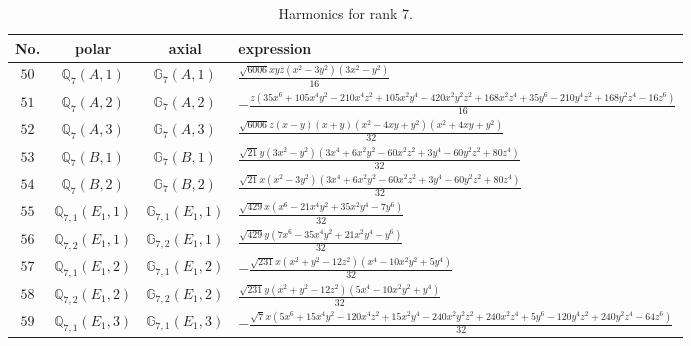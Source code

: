 \documentclass[fleqn,8pt,landscape]{jsarticle}
\begin{document}
\begin{table}[ht!]
\begin{center}
\caption{Harmonics for rank 7.}
\renewcommand{\arraystretch}{1.3}
\begin{tabular}{cccl} \hline \hline
No. & polar & axial & expression \\ \hline
$ 50 $ & $ \mathbb{Q}_{7}(A,1) $ & $ \mathbb{G}_{7}(A,1) $ & $ \frac{\sqrt{6006} x y z \left(x^{2} - 3 y^{2}\right) \left(3 x^{2} - y^{2}\right)}{16} $ \\
$ 51 $ & $ \mathbb{Q}_{7}(A,2) $ & $ \mathbb{G}_{7}(A,2) $ & $ - \frac{z \left(35 x^{6} + 105 x^{4} y^{2} - 210 x^{4} z^{2} + 105 x^{2} y^{4} - 420 x^{2} y^{2} z^{2} + 168 x^{2} z^{4} + 35 y^{6} - 210 y^{4} z^{2} + 168 y^{2} z^{4} - 16 z^{6}\right)}{16} $ \\
$ 52 $ & $ \mathbb{Q}_{7}(A,3) $ & $ \mathbb{G}_{7}(A,3) $ & $ \frac{\sqrt{6006} z \left(x - y\right) \left(x + y\right) \left(x^{2} - 4 x y + y^{2}\right) \left(x^{2} + 4 x y + y^{2}\right)}{32} $ \\
$ 53 $ & $ \mathbb{Q}_{7}(B,1) $ & $ \mathbb{G}_{7}(B,1) $ & $ \frac{\sqrt{21} y \left(3 x^{2} - y^{2}\right) \left(3 x^{4} + 6 x^{2} y^{2} - 60 x^{2} z^{2} + 3 y^{4} - 60 y^{2} z^{2} + 80 z^{4}\right)}{32} $ \\
$ 54 $ & $ \mathbb{Q}_{7}(B,2) $ & $ \mathbb{G}_{7}(B,2) $ & $ \frac{\sqrt{21} x \left(x^{2} - 3 y^{2}\right) \left(3 x^{4} + 6 x^{2} y^{2} - 60 x^{2} z^{2} + 3 y^{4} - 60 y^{2} z^{2} + 80 z^{4}\right)}{32} $ \\
$ 55 $ & $ \mathbb{Q}_{7,1}(E_{1},1) $ & $ \mathbb{G}_{7,1}(E_{1},1) $ & $ \frac{\sqrt{429} x \left(x^{6} - 21 x^{4} y^{2} + 35 x^{2} y^{4} - 7 y^{6}\right)}{32} $ \\
$ 56 $ & $ \mathbb{Q}_{7,2}(E_{1},1) $ & $ \mathbb{G}_{7,2}(E_{1},1) $ & $ \frac{\sqrt{429} y \left(7 x^{6} - 35 x^{4} y^{2} + 21 x^{2} y^{4} - y^{6}\right)}{32} $ \\
$ 57 $ & $ \mathbb{Q}_{7,1}(E_{1},2) $ & $ \mathbb{G}_{7,1}(E_{1},2) $ & $ - \frac{\sqrt{231} x \left(x^{2} + y^{2} - 12 z^{2}\right) \left(x^{4} - 10 x^{2} y^{2} + 5 y^{4}\right)}{32} $ \\
$ 58 $ & $ \mathbb{Q}_{7,2}(E_{1},2) $ & $ \mathbb{G}_{7,2}(E_{1},2) $ & $ \frac{\sqrt{231} y \left(x^{2} + y^{2} - 12 z^{2}\right) \left(5 x^{4} - 10 x^{2} y^{2} + y^{4}\right)}{32} $ \\
$ 59 $ & $ \mathbb{Q}_{7,1}(E_{1},3) $ & $ \mathbb{G}_{7,1}(E_{1},3) $ & $ - \frac{\sqrt{7} x \left(5 x^{6} + 15 x^{4} y^{2} - 120 x^{4} z^{2} + 15 x^{2} y^{4} - 240 x^{2} y^{2} z^{2} + 240 x^{2} z^{4} + 5 y^{6} - 120 y^{4} z^{2} + 240 y^{2} z^{4} - 64 z^{6}\right)}{32} $ \\

\end{tabular}
\end{center}
\end{table}
\end{document}
